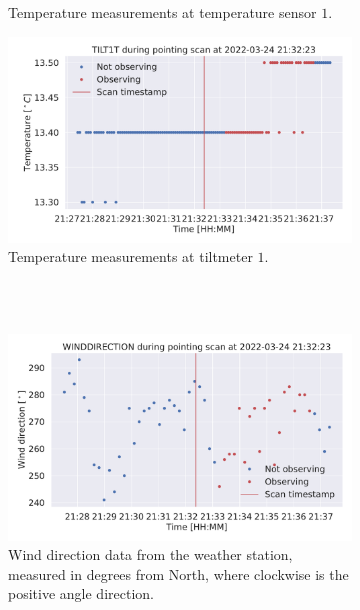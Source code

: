 \begin{figure}[H]
\begin{subfigure}[t]{0.49\textwidth}
        \caption{Temperature measurements at temperature sensor $1$.}
        \label{subfig:scan_temp1}
    \end{subfigure}
       \begin{subfigure}[t]{0.49\textwidth}
        \centering
        \includegraphics[width=\textwidth]{Feature during scans/scan_TILT1T_335.pdf}
        \caption{Temperature measurements at tiltmeter $1$.}
        \label{subfig:scan_tilt1t}
    \end{subfigure}
    \\~\\
    \begin{subfigure}[t]{0.49\textwidth}
        \centering
        \includegraphics[width=\textwidth]{Feature during scans/scan_WINDDIRECTION_335.pdf}
        \caption{Wind direction data from the weather station, measured in degrees from North, where clockwise is the positive angle direction.}
        \label{subfig:scan_winddir}
    \end{subfigure}
       \begin{subfigure}[t]{0.49\textwidth}

\end{subfigure}
\end{figure}
